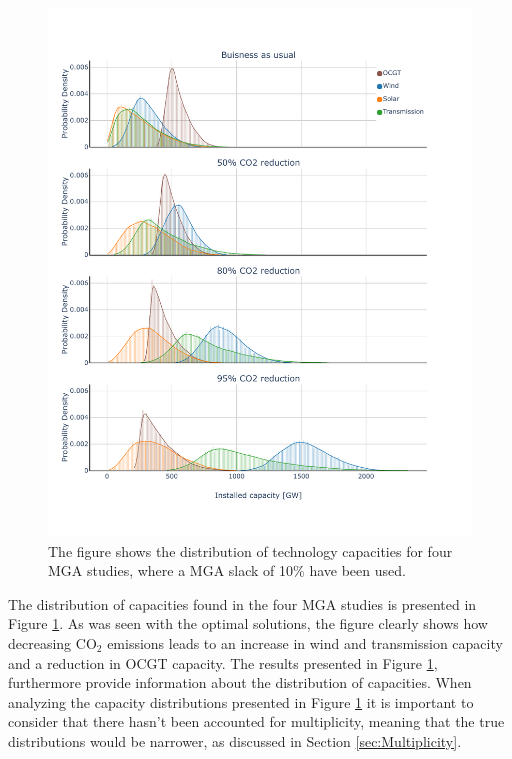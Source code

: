 
\begin{figure}[p]\centerfloat
	\includegraphics[width=1.2\textwidth,trim={0 1.5cm 0 0cm},clip]{./Images/4D_study_histogram}
	\caption{The figure shows the distribution of technology capacities for four MGA studies, where a MGA slack of 10\% have been used.}
	\label{fig:4d_hist}
\end{figure}


The distribution of capacities found in the four MGA studies is presented in Figure \ref{fig:4d_hist}. As was seen with the optimal solutions, the figure clearly shows how decreasing $\text{CO}_2$ emissions leads to an increase in wind and transmission capacity and a reduction in OCGT capacity. The results presented in Figure \ref{fig:4d_hist}, furthermore provide information about the distribution of capacities. When analyzing the capacity distributions presented in Figure \ref{fig:4d_hist} it is important to consider that there hasn't been accounted for multiplicity, meaning that the true distributions would be narrower, as discussed in Section \ref{sec:Multiplicity}.

